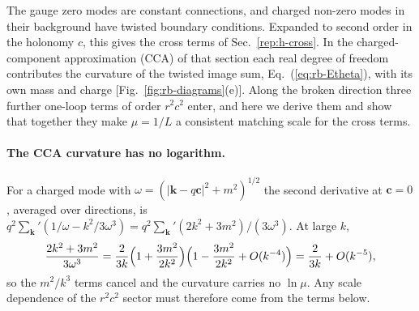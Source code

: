The gauge zero modes are constant connections, and charged non-zero modes in their background have twisted boundary conditions.
Expanded to second order in the holonomy $c$, this gives the cross terms of Sec.~\ref{rep:h-cross}.
In the charged-component approximation (CCA) of that section each real degree of freedom contributes the curvature of the twisted image sum, Eq.~(\ref{eq:rb-Etheta}), with its own mass and charge [Fig.~\ref{fig:rb-diagrams}(e)].
Along the broken direction three further one-loop terms of order $r^2c^2$ enter, and here we derive them and show that together they make $\mu=1/L$ a consistent matching scale for the cross terms.

\paragraph{The CCA curvature has no logarithm.}
For a charged mode with $\omega=(|\bm k-q\bm c|^2+m^2)^{1/2}$ the second derivative at $\bm c=0$, averaged over directions, is $q^2\sum_{\bm k}'(1/\omega-k^2/3\omega^3)=q^2\sum_{\bm k}'(2k^2+3m^2)/(3\omega^3)$.
At large $k$,
\begin{equation}
\frac{2k^2+3m^2}{3\omega^3}=\frac{2}{3k}\Bigl(1+\frac{3m^2}{2k^2}\Bigr)\Bigl(1-\frac{3m^2}{2k^2}+O(k^{-4})\Bigr)=\frac{2}{3k}+O(k^{-5}),
\label{eq:rb-noLog}
\end{equation}
so the $m^2/k^3$ terms cancel and the curvature carries no $\ln\mu$.
Any scale dependence of the $r^2c^2$ sector must therefore come from the terms below.

